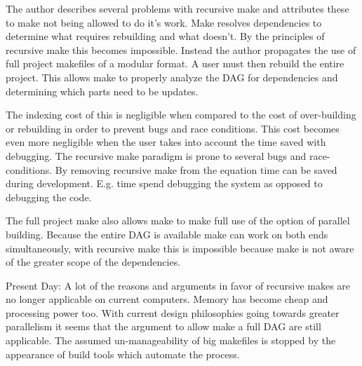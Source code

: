 The author describes several problems with recursive make and attributes these to make not being allowed to do it's work. Make resolves dependencies to determine what requires rebuilding and what doesn't. By the principles of recursive make this becomes impossible. Instead the author propagates the use of full project makefiles of a modular format. A user must then rebuild the entire project. This allows make to properly analyze the DAG for dependencies and determining which parts need to be updates.

The indexing cost of this is negligible when compared to the cost of over-building or rebuilding in order to prevent bugs and race conditions. This cost becomes even more negligible when the user takes into account the time saved with debugging. The recursive make paradigm is prone to several bugs and race-conditions. By removing recursive make from the equation time can be saved during development. E.g. time spend debugging the system as opposed to debugging the code.

The full project make also allows make to make full use of the option of parallel building. Because the entire DAG is available make can work on both ends simultaneously, with recursive make this is impossible because make is not aware of the greater scope of the dependencies.

Present Day:
A lot of the reasons and arguments in favor of recursive makes are no longer applicable on current computers. Memory has become cheap and processing power too. With current design philosophies going towards greater parallelism it seems that the argument to allow make a full DAG are still applicable. The assumed un-manageability of big makefiles is stopped by the appearance of build tools which automate the process.


